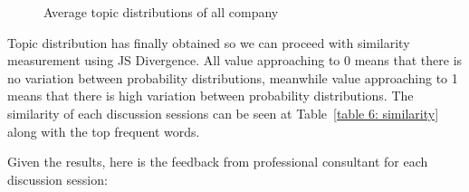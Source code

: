 \documentclass[10pt, conference, compsocconf]{IEEEtran}
\begin{document}
\begin{figure}[t]
\caption{Average topic distributions of all company}
\label{fig_c}
\end{figure}

Topic distribution has finally obtained so we can proceed with similarity measurement using JS Divergence. All value approaching to 0 means that there is no variation between probability distributions, meanwhile value approaching to 1 means that there is high variation between probability distributions. The similarity of each discussion sessions can be seen at Table~\ref{table 6: similarity} along with the top frequent words. 

\begin{table}[b]
\caption{Similarity and Top Words}
\label{table 6: similarity}
\end{table}

Given the results, here is the feedback from professional consultant for each discussion session:
\medskip
\end{document}
